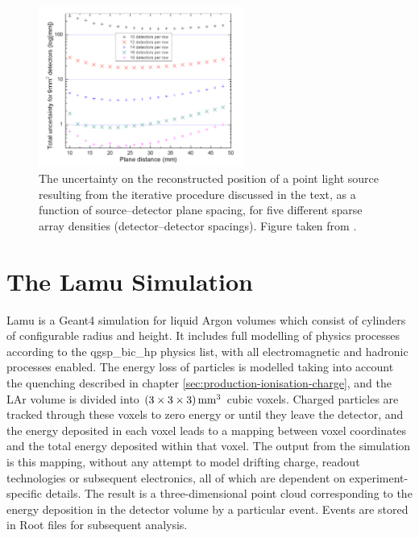 \begin{figure}
\centering
\includegraphics[width=0.6\textwidth]{chapters/detectorphysics_images/detector-spacing}
\caption[Uncertainty on position resolution for several sparse array detector densities]{\label{fig:detector-spacing}The uncertainty on the reconstructed position of a point light source resulting from the iterative procedure discussed in the text, as a function of source--detector plane spacing, for five different sparse array densities (detector--detector spacings). Figure taken from \citep{Rutter2011}.}
\end{figure}

\section{The Lamu Simulation}\label{sec:lamu}
Lamu is a Geant4\citep{Geant4} simulation for liquid Argon volumes which consist of cylinders of configurable radius and height. It includes full modelling of physics processes according to the {\sc qgsp\_bic\_hp} physics list, with all electromagnetic and hadronic processes enabled. The energy loss of particles is modelled taking into account the quenching described in chapter \ref{sec:production-ionisation-charge}, and the \ac{LAr} volume is divided into $(3\times 3\times 3) \,\mathrm{mm}^3$ cubic voxels. Charged particles are tracked through these voxels to zero energy or until they leave the detector, and the energy deposited in each voxel leads to a mapping between voxel coordinates and the total energy deposited within that voxel. The output from the simulation is this mapping, without any attempt to model drifting charge, readout technologies or subsequent electronics, all of which are dependent on experiment-specific details. The result is a three-dimensional point cloud corresponding to the energy deposition in the detector volume by a particular event. Events are stored in {\sc Root}\citep{Root} files for subsequent analysis.

